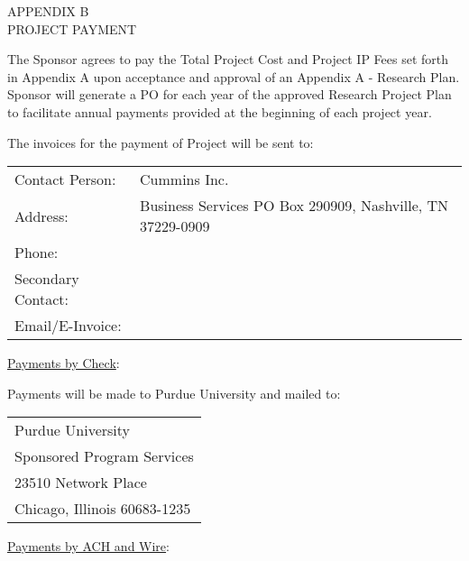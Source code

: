 \begin{center}
    APPENDIX B\\
    \bigskip
    PROJECT PAYMENT
\end{center}


The Sponsor agrees to pay the Total Project Cost and Project IP Fees set forth
in Appendix A upon acceptance and approval of an Appendix A - Research Plan.
Sponsor will generate a PO for each year of the approved Research Project Plan
to facilitate annual payments provided at the beginning of each project year.


The invoices for the payment of Project will be sent to:

\begin{table}[H]
    \centering
    \begin{tabular}{l l}
        Contact Person: & Cummins Inc.\\
        Address: & Business Services PO Box 290909, Nashville, TN  37229-0909 \\
        Phone: & \\
        Secondary Contact: & \\
        Email/E-Invoice: &
    \end{tabular}
\end{table}

\underline{Payments by Check}:

Payments will be made to Purdue University and mailed to:
\begin{table}[H]
    \centering
    \begin{tabular}{l}
        Purdue University\\
        Sponsored Program Services\\
        23510 Network Place\\
        Chicago, Illinois 60683-1235
    \end{tabular}
\end{table}


\underline{Payments by ACH and Wire}:

